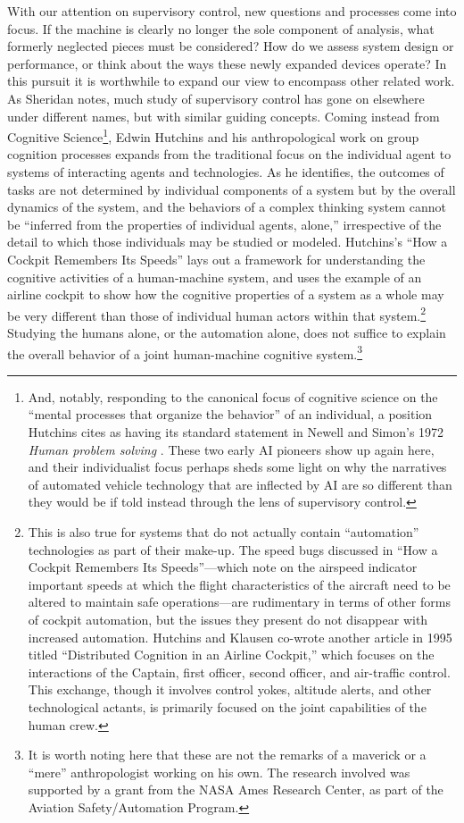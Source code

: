 With our attention on supervisory control, new questions and processes
come into focus. If the machine is clearly no
longer the sole component of analysis, what formerly neglected pieces
must be considered? How do we assess system design or performance, or
think about the ways these newly expanded devices operate? In this
pursuit it is worthwhile to expand our
view to encompass other related work. As Sheridan notes, much study of
supervisory control has gone on elsewhere under different names, but
with similar guiding concepts. Coming instead from Cognitive
Science\footnote{And, notably, responding to the canonical focus of
  cognitive science on the ``mental processes that organize the
  behavior'' of an individual, a position Hutchins cites as having its
standard statement in Newell and Simon's 1972 \emph{Human problem
  solving} \cite[p. 265-266]{hutchinsCockpit}. These two early AI pioneers show
up again here, and their individualist focus perhaps sheds some 
light on why the narratives of automated vehicle technology that are
inflected by AI are so different than they would be if told instead
through the lens of supervisory control.},
Edwin Hutchins and his anthropological work on group cognition
processes expands from the traditional focus on the individual agent
to systems of interacting agents and technologies. As he identifies,
the outcomes of tasks are not determined by individual components of a
system but by the overall dynamics of the system, and the behaviors of
a complex thinking system cannot be ``inferred from the properties of
individual agents, alone,'' irrespective of the detail to which those
individuals may be studied or modeled.\cite[p. 265]{hutchinsCockpit}
Hutchins's ``How a Cockpit Remembers Its Speeds'' lays out a framework
for understanding the cognitive activities of a human-machine system,
and uses the example of an airline cockpit to show how the cognitive
properties of a system as a whole may be very different than those of
individual human actors within that system.\footnote{This is also true
for systems that do not actually contain ``automation'' technologies
as part of their make-up. The speed bugs discussed in ``How a Cockpit
Remembers Its Speeds''---which note on the airspeed indicator
important speeds at which the 
flight characteristics of the aircraft need to be altered to maintain
safe operations---are rudimentary in terms of other forms of
cockpit automation, but the issues they present do not disappear with
increased automation. Hutchins and Klausen co-wrote another
article in 1995 titled ``Distributed Cognition in an Airline
Cockpit,''\cite{???-hutchinsKlausen} which focuses on the interactions of the Captain, first
officer, second officer, and air-traffic control. This exchange,
though it involves control yokes, altitude alerts, and other
technological actants, is primarily focused on the joint capabilities
of the human crew.} Studying the humans alone,
or the automation alone, does not suffice to explain the overall
behavior of a joint human-machine cognitive system.\footnote{It is
  worth noting here that these are not the remarks of a maverick or a
  ``mere'' anthropologist working on his own. The research involved
  was supported by a grant from the NASA Ames Research Center, as part
  of the Aviation Safety/Automation Program.}

